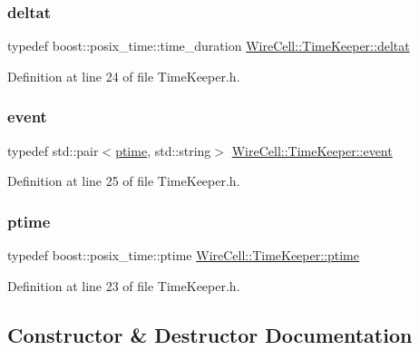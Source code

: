 \subsubsection{\texorpdfstring{deltat}{deltat}}
{\footnotesize\ttfamily typedef boost\+::posix\+\_\+time\+::time\+\_\+duration \hyperlink{class_wire_cell_1_1_time_keeper_a3e7203525811fc9902aab31615d18ad2}{Wire\+Cell\+::\+Time\+Keeper\+::deltat}}



Definition at line 24 of file Time\+Keeper.\+h.

\mbox{\label{class_wire_cell_1_1_time_keeper_a005e8d06f1e537abed3a83184ccfcc5e}} 
\subsubsection{\texorpdfstring{event}{event}}
{\footnotesize\ttfamily typedef std\+::pair$<$\hyperlink{class_wire_cell_1_1_time_keeper_a3600404e97a1581a1c2630f92f490603}{ptime}, std\+::string$>$ \hyperlink{class_wire_cell_1_1_time_keeper_a005e8d06f1e537abed3a83184ccfcc5e}{Wire\+Cell\+::\+Time\+Keeper\+::event}}



Definition at line 25 of file Time\+Keeper.\+h.

\mbox{\label{class_wire_cell_1_1_time_keeper_a3600404e97a1581a1c2630f92f490603}} 
\subsubsection{\texorpdfstring{ptime}{ptime}}
{\footnotesize\ttfamily typedef boost\+::posix\+\_\+time\+::ptime \hyperlink{class_wire_cell_1_1_time_keeper_a3600404e97a1581a1c2630f92f490603}{Wire\+Cell\+::\+Time\+Keeper\+::ptime}}



Definition at line 23 of file Time\+Keeper.\+h.



\subsection{Constructor \& Destructor Documentation}
\mbox{\label{class_wire_cell_1_1_time_keeper_a71e344c3be3c8fc0e156fb41cb6bb0f4}} 
